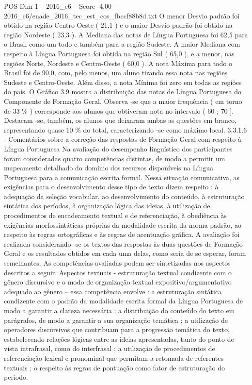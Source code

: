 \begin{textsample}{POS Dim 1 – 2016\_c6 – Score -4.00 – 2016\_c6/enade\_2016\_tec\_est\_cos\_fbccf88b8d.txt}
O menor Desvio padrão foi obtido na região Centro-Oeste ( 21,1 ) e o maior Desvio padrão foi obtido na região Nordeste ( 23,3 ).
A Mediana das notas de Língua Portuguesa foi 62,5 para o Brasil como um todo e também para a região Sudeste.
A maior Mediana com respeito à Língua Portuguesa foi obtida na região Sul ( 65,0 ), e a menor, nas regiões Norte, Nordeste e Centro-Oeste ( 60,0 ).
A nota Máxima para todo o Brasil foi de 90,0, com, pelo menos, um aluno tirando essa nota nas regiões Sudeste e Centro-Oeste.
Além disso, a nota Mínima foi zero em todas as regiões do país.
O Gráfico 3.9 mostra a distribuição das notas de Língua Portuguesa do Componente de Formação Geral.
Observa -se que a maior frequência ( em torno de 33 \% ) corresponde aos alunos que obtiveram nota no intervalo ( 60 ; 70 ].
Destacam -se, também, os alunos que deixaram ambas as questões em branco, representando quase 10 \% do total, caracterizando -se como máximo local. 3.3.1.6 - Comentários sobre a correção das respostas de Formação Geral com respeito à Língua Portuguesa Na avaliação do desempenho linguístico dos participantes foram consideradas quatro competências distintas, de modo a permitir um mapeamento detalhado do domínio dos recursos disponíveis na Língua Portuguesa para a comunicação escrita formal.
Nessa situação comunicativa, as exigências para o desenvolvimento desse tipo de texto dizem respeito : à adequação da seleção vocabular, ao desenvolvimento do conteúdo, à estruturação sintática dos períodos, à organização lógica das ideias, à utilização de procedimentos de encadeamento textual e de referenciação, à obediência às exigências morfossintáticas próprias da modalidade escrita da norma-padrão, ao respeito às regras ortográficas e às regras de acentuação gráfica.
A avaliação foi realizada considerando -se os textos das respostas às duas questões de Formação Geral e os resultados obtidos em cada uma delas, como seria de se esperar, foram semelhantes.
As competências avaliadas podem ser sintetizadas nos aspectos descritos a seguir.
Aspectos textuais - estruturação textual condizente com o gênero discursivo e o modo de organização textual expositivo/argumentativo adequado ao gênero – essa competência envolve : a estruturação sintática condizente com o padrão da modalidade escrita formal da Língua Portuguesa de modo a garantir a clareza necessária ; a distribuição do conteúdo do texto em parágrafos, de modo a garantir a sua organização temática ; a utilização de operadores discursivos que contribuam para a progressão temática do texto, estabelecendo relações lógicas entre as ideias apresentadas, tanto do ponto de vista intrafrasal, como do interfrasal ; a utilização de procedimentos de referenciação lexical e pronominal que permitam a retomada de referentes textuais ; o respeito às regras de pontuação como fator de estruturação do período.

\end{textsample}
